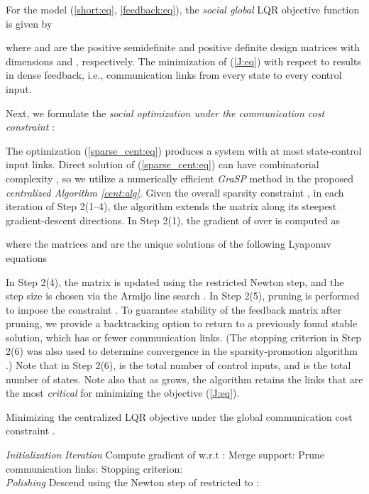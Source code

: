 \documentclass[12pt, draftclsnofoot,onecolumn]{IEEEtran}
\begin{document}
For the model (\ref{short:eq}, \ref{feedback:eq}), the {\it social global} LQR objective function is given by \cite{lewis1995optimal}

\noindent where  and  are the positive semidefinite and positive definite design matrices with dimensions  and , respectively. The minimization of (\ref{J:eq}) with respect to  results in dense feedback, i.e., communication links from every state to every control input.

Next, we formulate the {\it social optimization under the communication cost constraint }: 

\noindent
The optimization (\ref{sparse_cent:eq}) produces a system with at most  state-control input links. Direct solution of (\ref{sparse_cent:eq}) can have combinatorial complexity \cite{bahmani2013greedy}, so we utilize a numerically efficient {\it GraSP} method \cite{bahmani2013greedy} in the proposed {\it centralized Algorithm \ref{cent:alg}}. Given the overall sparsity constraint , in each iteration of Step 2(1--4), the algorithm extends the matrix  along its steepest  gradient-descent directions. In Step 2(1), the gradient of  over  is computed as \cite{fardad2009optimal} 

\noindent where the matrices  and  are the unique solutions of the following Lyaponuv equations

\noindent In Step 2(4), the matrix  is updated using the restricted Newton step, and the step size  is chosen via the Armijo line search \cite{Boyd:2004aa}. In Step 2(5), pruning is performed to impose the constraint . To guarantee stability of the feedback matrix after pruning, we provide a backtracking option to return to a previously found stable solution, which has  or fewer communication links. (The stopping criterion in Step 2(6) was also used to determine convergence in the sparsity-promotion algorithm \cite{dorjovchebulTPS14}.) Note that in Step 2(6),  is the total number of control inputs, and  is the total number of states. Note also that as  grows, the algorithm retains the links that are the most {\it critical} for minimizing the objective (\ref{J:eq}).



\begin{algorithm}[!t]
	 \caption{Minimizing the centralized LQR objective under the global communication cost constraint .}
	 \label{cent:alg}
	\begin{algorithmic}
	 {\it Initialization} 
	\State 
	 {\it Iteration} 
	 {Compute gradient of  w.r.t : }
	 {Merge support: }
	 {Prune communication links: }
     {Stopping criterion: \\}
    \EndWhile
	 {\it Polishing}
	\State {} 
\State Descend using the Newton step of  restricted to : \\
	\EndWhile
	 \end{algorithmic}
\end{algorithm}
\end{document}
